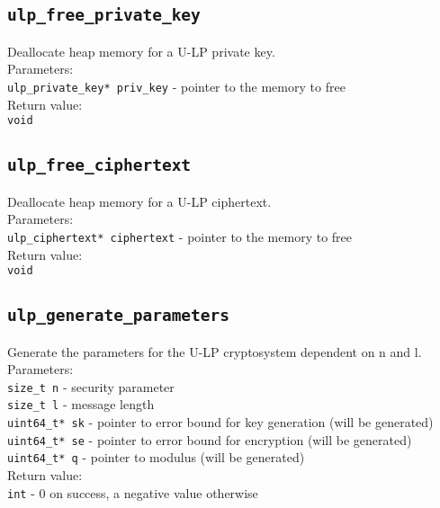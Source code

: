 \documentclass[10pt,a4paper]{article}
\begin{document}
\subsection*{\texttt{ulp\_free\_private\_key}}
Deallocate heap memory for a U-LP private key.\\
Parameters:\\
\texttt{ulp\_private\_key* priv\_key} - pointer to the memory to free\\
Return value:\\
\texttt{void}

\subsection*{\texttt{ulp\_free\_ciphertext}}
Deallocate heap memory for a U-LP ciphertext.\\
Parameters:\\
\texttt{ulp\_ciphertext* ciphertext} - pointer to the memory to free\\
Return value:\\
\texttt{void}

\subsection*{\texttt{ulp\_generate\_parameters}}
Generate the parameters for the U-LP cryptosystem dependent on n and l.\\
Parameters:\\
\texttt{size\_t n} - security parameter\\
\texttt{size\_t l} - message length\\
\texttt{uint64\_t* sk} - pointer to error bound for key generation (will be generated)\\
\texttt{uint64\_t* se} - pointer to error bound for encryption (will be generated)\\
\texttt{uint64\_t* q} - pointer to modulus (will be generated)\\
Return value:\\
\texttt{int} - 0 on success, a negative value otherwise
\end{document}
